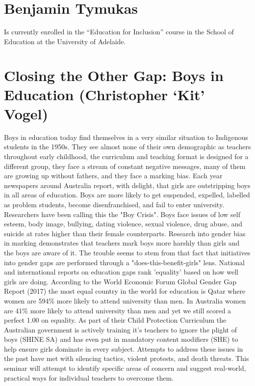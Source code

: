 \documentclass[twoside,14pt,a4paper,notitlepage]{memoir}
\begin{document}
\section*{Benjamin Tymukas}

Is currently enrolled in the ``Education for Inclusion'' course in the School of Education at the University of Adelaide.



\section*{Closing the Other Gap: Boys in Education (Christopher `Kit' Vogel)}
\label{aut:vogel}

Boys in education today find themselves in a very similar situation to Indigenous students in the 1950s. They see almost none of their own demographic as teachers throughout early childhood, the curriculum and teaching format is designed for a different group, they face a stream of constant negative messages, many of them are growing up without fathers, and they face a marking bias.
Each year newspapers around Australia report, with delight, that girls are outstripping boys in all areas of education. Boys are more likely to get suspended, expelled, labelled as problem students, become disenfranchised, and fail to enter university. Researchers have been calling this the "Boy Crisis".
Boys face issues of low self esteem, body image, bullying, dating violence, sexual violence, drug abuse, and suicide at rates higher than their female counterparts. Research into gender bias in marking demonstrates that teachers mark boys more harshly than girls and the boys are aware of it.
The trouble seems to stem from that fact that initiatives into gender gaps are performed through a "does-this-benefit-girls" lens. National and international reports on education gaps rank 'equality' based on how well girls are doing. According to the World Economic Forum Global Gender Gap Report (2017) the most equal country in the world for education is Qatar where women are 594\% more likely to attend university than men. In Australia women are 41\% more likely to attend university than men and yet we still scored a perfect 1.00 on equality.
As part of their Child Protection Curriculum the Australian government is actively training it's teachers to ignore the plight of boys (SHINE SA) and has even put in mandatory content modifiers (SHE) to help ensure girls dominate in every subject.
Attempts to address these issues in the past have met with silencing tactics, violent protests, and death threats.
This seminar will attempt to identify specific areas of concern and suggest real-world, practical ways for individual teachers to overcome them.
\end{document}

